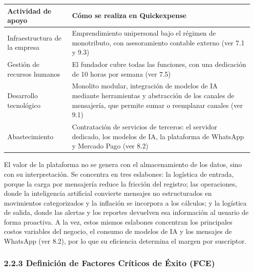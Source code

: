 {\def\LTcaptype{none} %
\begin{longtable}[]{@{}
  >{\raggedright\arraybackslash}p{}
  >{\raggedright\arraybackslash}p{}@{}}
\toprule\noalign{}
\begin{minipage}[b]{\linewidth}\raggedright
Actividad de apoyo
\end{minipage} & \begin{minipage}[b]{\linewidth}\raggedright
Cómo se realiza en Quickexpense
\end{minipage} \\
\midrule\noalign{}
\endhead
\bottomrule\noalign{}
\endlastfoot
Infraestructura de la empresa & Emprendimiento unipersonal bajo el
régimen de monotributo, con asesoramiento contable externo (ver 7.1 y
9.3) \\
Gestión de recursos humanos & El fundador cubre todas las funciones, con
una dedicación de 10 horas por semana (ver 7.5) \\
Desarrollo tecnológico & Monolito modular, integración de modelos de IA
mediante herramientas y abstracción de los canales de mensajería, que
permite sumar o reemplazar canales (ver 9.1) \\
Abastecimiento & Contratación de servicios de terceros: el servidor
dedicado, los modelos de IA, la plataforma de WhatsApp y Mercado Pago
(ver 8.2) \\
\end{longtable}
}

El valor de la plataforma no se genera con el almacenamiento de los
datos, sino con su interpretación. Se concentra en tres eslabones: la
logística de entrada, porque la carga por mensajería reduce la fricción
del registro; las operaciones, donde la inteligencia artificial
convierte mensajes no estructurados en movimientos categorizados y la
inflación se incorpora a los cálculos; y la logística de salida, donde
las alertas y los reportes devuelven esa información al usuario de forma
proactiva. A la vez, estos mismos eslabones concentran los principales
costos variables del negocio, el consumo de modelos de IA y los mensajes
de WhatsApp (ver 8.2), por lo que su eficiencia determina el margen por
suscriptor.

\subsubsection*{2.2.3 Definición de Factores Críticos de Éxito
(FCE)}\label{definiciuxf3n-de-factores-cruxedticos-de-uxe9xito-fce}

